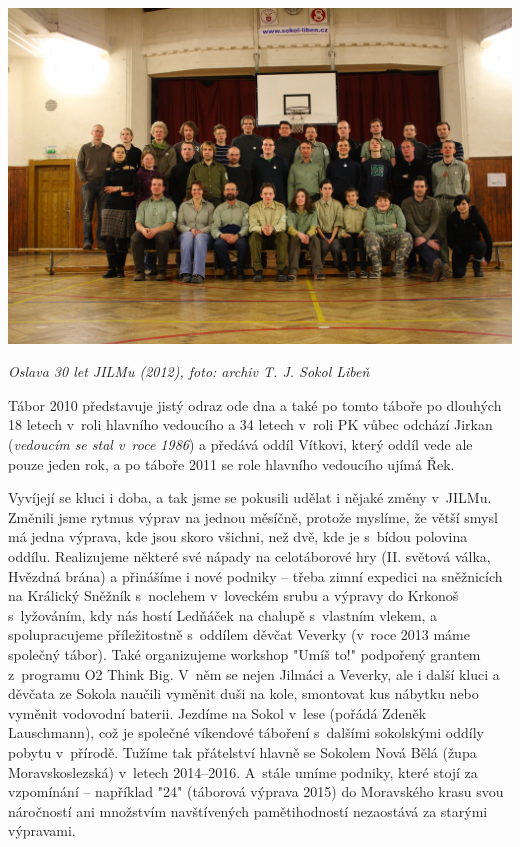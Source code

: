 \documentclass[a5paper, 11pt, twoside]{article}
\begin{document}
 \includegraphics[width=\textwidth]{img/82_jilm_30.JPG}

\textit{Oslava 30 let JILMu (2012), foto: archiv T. J. Sokol Libeň}

Tábor 2010 představuje jistý odraz ode dna a také po tomto táboře po
dlouhých 18 letech v~roli hlavního vedoucího a 34 letech v~roli PK vůbec
odchází Jirkan (\textit{vedoucím se stal v~roce 1986}) a předává oddíl
Vítkovi, který oddíl vede ale pouze jeden rok, a po táboře 2011 se role
hlavního vedoucího ujímá Řek.

Vyvíjejí se kluci i doba, a tak jsme se pokusili udělat i nějaké změny
v~JILMu. Změnili jsme rytmus výprav na jednou měsíčně, protože myslíme, že
větší smysl má jedna výprava, kde jsou skoro všichni, než dvě, kde je
s~bídou polovina oddílu. Realizujeme některé své nápady na celotáborové
hry (II. světová válka, Hvězdná brána) a přinášíme i nové podniky --
třeba zimní expedici na sněžnicích na Králický Sněžník s~noclehem
v~loveckém srubu a výpravy do Krkonoš s~lyžováním, kdy nás hostí Ledňáček
na chalupě s~vlastním vlekem, a spolupracujeme příležitostně s~oddílem
děvčat Veverky (v~roce 2013 máme společný tábor). Také organizujeme
workshop "Umíš to!" podpořený grantem z~programu O2 Think Big. V~něm
se nejen Jilmáci a Veverky, ale i další kluci a děvčata ze Sokola
naučili vyměnit duši na kole, smontovat kus nábytku nebo vyměnit
vodovodní baterii. Jezdíme na Sokol v~lese (pořádá Zdeněk Lauschmann),
což je společné víkendové táboření s~dalšími sokolskými oddíly pobytu
v~přírodě. Tužíme tak přátelství hlavně se Sokolem Nová Bělá (župa
Moravskoslezská) v~letech 2014--2016. A~stále umíme podniky, které stojí
za vzpomínání -- například "24" (táborová výprava 2015) do Moravského
krasu svou náročností ani množstvím navštívených pamětihodností
nezaostává za starými výpravami.
\end{document}
